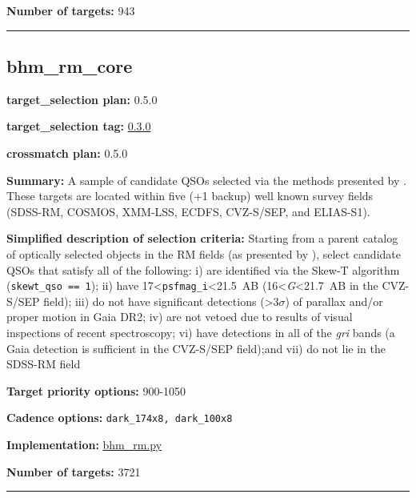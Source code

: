 \noindent\textbf{Number of targets:} 943

\begin{center}\rule{0.5\linewidth}{0.5pt}\end{center}

\hypertarget{bhm_rm_core_plan0.5.0}{%
\subsection{bhm\_rm\_core}\label{bhm_rm_core_plan0.5.0}}

\noindent\textbf{target\_selection plan:} 0.5.0

\noindent\textbf{target\_selection tag:}
\href{https://github.com/sdss/target_selection/tree/0.3.0/}{0.3.0}

\noindent\textbf{crossmatch plan:} 0.5.0

\noindent\textbf{Summary:} A sample of candidate QSOs selected via the methods
presented by
\citet{Yang2022}. These targets are located within five (+1 backup) well
known survey fields (SDSS-RM, COSMOS, XMM-LSS, ECDFS, CVZ-S/SEP, and
ELIAS-S1).

\noindent\textbf{Simplified description of selection criteria:} Starting from a
parent catalog of optically selected objects in the RM fields (as
presented by
\citealt{Yang2022}), select candidate QSOs that satisfy all of the
following: i) are identified via the Skew-T algorithm
(\texttt{skewt\_qso\ ==\ 1}); ii) have
17\textless{}\texttt{psfmag\_i}\textless21.5~AB
(16\textless{}\emph{G}\textless21.7~AB in the CVZ-S/SEP field); iii) do
not have significant detections (\textgreater3$\sigma$) of parallax and/or
proper motion in Gaia DR2; iv) are not vetoed due to results of visual
inspections of recent spectroscopy; vi) have detections in all of the
\emph{gri} bands (a Gaia detection is sufficient in the CVZ-S/SEP
field);and vii) do not lie in the SDSS-RM field


\noindent\textbf{Target priority options:} 900-1050

\noindent\textbf{Cadence options:} \texttt{dark\_174x8,\ dark\_100x8}

\noindent\textbf{Implementation:}
\href{https://github.com/sdss/target_selection/blob/0.3.0/python/target_selection/cartons/bhm_rm.py}{bhm\_rm.py}

\noindent\textbf{Number of targets:} 3721

\begin{center}\rule{0.5\linewidth}{0.5pt}\end{center}

